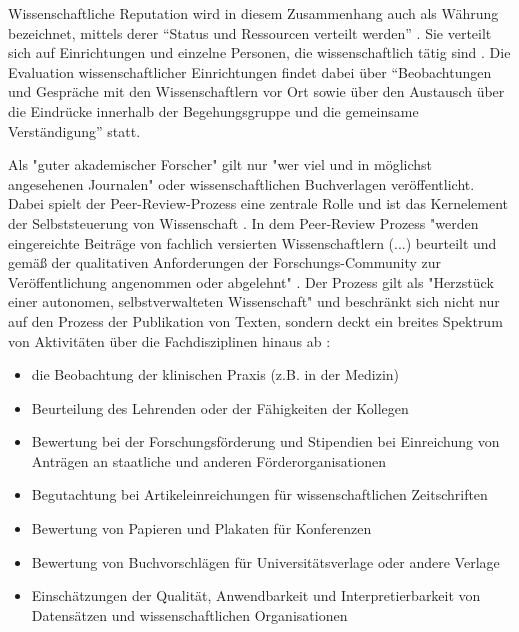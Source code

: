 Wissenschaftliche Reputation wird in diesem Zusammenhang auch als Währung bezeichnet, mittels derer “Status und Ressourcen verteilt werden” \cite{hanekop_2006}. Sie verteilt sich auf Einrichtungen und einzelne Personen, die wissenschaftlich tätig sind \cite{suchen}. Die Evaluation wissenschaftlicher Einrichtungen findet dabei über “Beobachtungen und Gespräche mit den Wissenschaftlern vor Ort sowie über den Austausch über die Eindrücke innerhalb der Begehungsgruppe und die gemeinsame Verständigung”\cite{Barl_sius_2008} statt.

Als "guter akademischer Forscher" gilt nur "wer viel und in möglichst angesehenen Journalen" \cite{Frey_2005} oder wissenschaftlichen Buchverlagen veröffentlicht. Dabei spielt der Peer-Review-Prozess eine zentrale Rolle und ist das Kernelement der Selbststeuerung von Wissenschaft \cite{Neidhardt_2010}. In dem Peer-Review Prozess "werden eingereichte Beiträge von fachlich versierten Wissenschaftlern (...) beurteilt und gemäß der qualitativen Anforderungen der Forschungs-Community zur Veröffentlichung angenommen oder abgelehnt" \cite{Hess_2006}. Der Prozess gilt als "Herzstück einer autonomen, selbstverwalteten Wissenschaft" \cite{suchen_Hornbostel_2006} und beschränkt sich nicht nur auf den Prozess der Publikation von Texten, sondern deckt ein breites Spektrum von Aktivitäten über die Fachdisziplinen hinaus ab \cite{Lee_2012}:
\begin{itemize}
\item die Beobachtung der klinischen Praxis (z.B. in der Medizin)
\item Beurteilung des Lehrenden oder der Fähigkeiten der Kollegen
\item Bewertung bei der Forschungsförderung und Stipendien bei Einreichung von Anträgen an staatliche und anderen Förderorganisationen
\item Begutachtung bei Artikeleinreichungen für wissenschaftlichen Zeitschriften
\item Bewertung von Papieren und Plakaten für Konferenzen
\item Bewertung von Buchvorschlägen für Universitätsverlage oder andere Verlage
\item Einschätzungen der Qualität, Anwendbarkeit und Interpretierbarkeit von Datensätzen und wissenschaftlichen Organisationen
\end{itemize}

